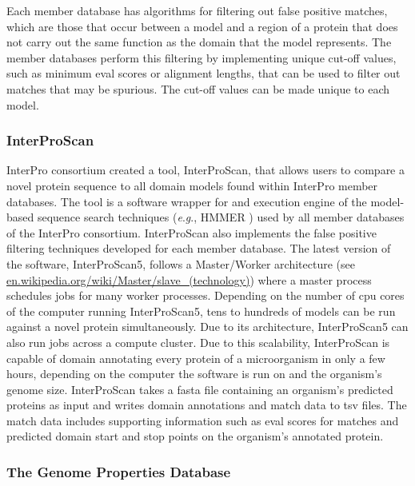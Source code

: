 \pagebreak
Each member database has algorithms for filtering out false positive matches, 
which are those that occur between a model and a region of a protein that does 
not carry out the same function as the domain that the model represents. The 
member databases perform this filtering by implementing unique cut-off values, 
such as minimum \gls{eval} scores or alignment lengths, that can be used to 
filter out matches that may be spurious. The cut-off values can be made unique 
to each model. 

\subsubsection{InterProScan}

InterPro consortium created a tool, InterProScan, that allows users to compare a 
novel protein sequence to all domain models found within InterPro member 
databases. The tool is a software wrapper for and execution engine of the 
model-based sequence search techniques (\textit{e}.\textit{g}., HMMER 
\cite{eddy2011accelerated}) used by all member databases of the InterPro 
consortium. InterProScan also implements the false positive filtering techniques 
developed for each member database. The latest version of the software, 
InterProScan5, follows a Master/Worker architecture (see 
\href{http://en.wikipedia.org/wiki/Master/slave_(technology)}{en.wikipedia.org/wiki/Master/slave\_(technology)}) 
where a master process schedules jobs for many worker processes. Depending on 
the number of \gls{cpu} cores of the computer running InterProScan5, tens to 
hundreds of models can be run against a novel protein simultaneously. Due to its 
architecture, InterProScan5 can also run jobs across a compute cluster. Due 
to this scalability, InterProScan is capable of domain annotating every protein 
of a microorganism in only a few hours, depending on the computer the software 
is run on and the organism's genome size. InterProScan takes a \gls{fasta} file 
\cite{pearson19905} containing an organism's predicted proteins as input and 
writes domain annotations and match data to \gls{tsv} files. The match data 
includes supporting information such as \gls{eval} scores for matches and 
predicted domain start and stop points on the organism's annotated protein.

\subsubsection{The Genome Properties Database} 


